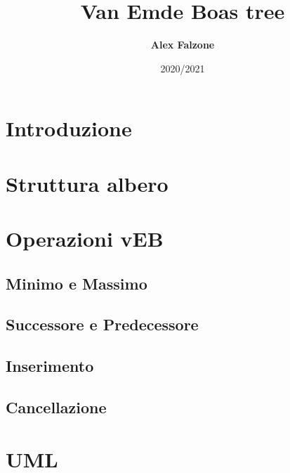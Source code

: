 \documentclass{article}
\title{\textbf{Van Emde Boas tree}}
\author{\textbf{Alex Falzone} }
\date{2020/2021}
\begin{document}
\maketitle
\section{Introduzione}
\section{Struttura albero}
\section{Operazioni vEB}
\subsection{Minimo e Massimo}
\subsection{Successore e Predecessore}
\subsection{Inserimento}
\subsection{Cancellazione}
\section{UML}
\newpage
\end{document}
